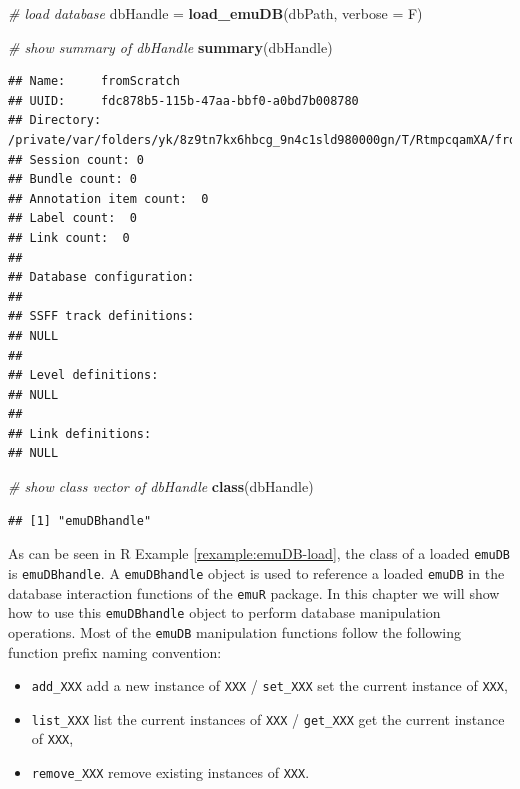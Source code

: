 \documentclass[]{book}
\newenvironment{Shaded}{\begin{snugshade}}{\end{snugshade}}
\newcommand{\CommentTok}[1]{\textcolor[rgb]{0.56,0.35,0.01}{\textit{#1}}}
\newcommand{\DataTypeTok}[1]{\textcolor[rgb]{0.13,0.29,0.53}{#1}}
\newcommand{\KeywordTok}[1]{\textcolor[rgb]{0.13,0.29,0.53}{\textbf{#1}}}
\newcommand{\NormalTok}[1]{#1}
\newcommand{\StringTok}[1]{\textcolor[rgb]{0.31,0.60,0.02}{#1}}
\providecommand{\tightlist}{%
  \setlength{\itemsep}{0pt}\setlength{\parskip}{0pt}}
\theoremstyle{definition}
\theoremstyle{definition}
\theoremstyle{definition}
\theoremstyle{remark}
\begin{document}
\begin{Shaded}
\begin{Highlighting}[]
\CommentTok{# load database}
\NormalTok{dbHandle =}\StringTok{ }\KeywordTok{load_emuDB}\NormalTok{(dbPath, }\DataTypeTok{verbose =}\NormalTok{ F)}

\CommentTok{# show summary of dbHandle}
\KeywordTok{summary}\NormalTok{(dbHandle)}
\end{Highlighting}
\end{Shaded}

\begin{verbatim}
## Name:     fromScratch 
## UUID:     fdc878b5-115b-47aa-bbf0-a0bd7b008780 
## Directory:    /private/var/folders/yk/8z9tn7kx6hbcg_9n4c1sld980000gn/T/RtmpcqamXA/fromScratch_emuDB 
## Session count: 0 
## Bundle count: 0 
## Annotation item count:  0 
## Label count:  0 
## Link count:  0 
## 
## Database configuration:
## 
## SSFF track definitions:
## NULL
## 
## Level definitions:
## NULL
## 
## Link definitions:
## NULL
\end{verbatim}

\begin{Shaded}
\begin{Highlighting}[]
\CommentTok{# show class vector of dbHandle}
\KeywordTok{class}\NormalTok{(dbHandle)}
\end{Highlighting}
\end{Shaded}

\begin{verbatim}
## [1] "emuDBhandle"
\end{verbatim}

As can be seen in R Example \ref{rexample:emuDB-load}, the class of a
loaded \texttt{emuDB} is \texttt{emuDBhandle}. A \texttt{emuDBhandle}
object is used to reference a loaded \texttt{emuDB} in the database
interaction functions of the \texttt{emuR} package. In this chapter we
will show how to use this \texttt{emuDBhandle} object to perform
database manipulation operations. Most of the \texttt{emuDB}
manipulation functions follow the following function prefix naming
convention:

\begin{itemize}
\tightlist
\item
  \texttt{add\_XXX} add a new instance of \texttt{XXX} /
  \texttt{set\_XXX} set the current instance of \texttt{XXX},
\item
  \texttt{list\_XXX} list the current instances of \texttt{XXX} /
  \texttt{get\_XXX} get the current instance of \texttt{XXX},
\item
  \texttt{remove\_XXX} remove existing instances of \texttt{XXX}.
\end{itemize}
\end{document}

